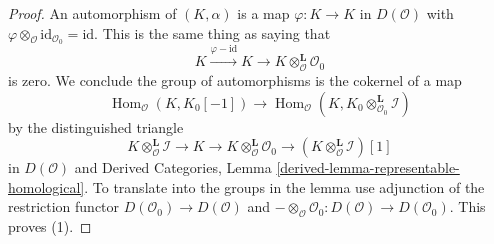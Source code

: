 \documentclass{stacks-project}
\theoremstyle{plain}
\theoremstyle{definition}
\theoremstyle{remark}
\numberwithin{equation}{subsection}
\def\Hom{\mathop{\mathrm{Hom}}\nolimits}
\begin{document}
\begin{proof}
An automorphism of $(K, \alpha)$ is a map $\varphi : K \to K$
in $D(\mathcal{O})$ with
$\varphi \otimes_\mathcal{O} \text{id}_{\mathcal{O}_0} = \text{id}$.
This is the same thing as saying that
$$
K \xrightarrow{\varphi - \text{id}} K \to
K \otimes_\mathcal{O}^\mathbf{L} \mathcal{O}_0
$$
is zero. We conclude the group of automorphisms is
the cokernel of a map
$$
\Hom_\mathcal{O}(K, K_0[-1])
\longrightarrow
\Hom_\mathcal{O}(K, K_0 \otimes_{\mathcal{O}_0}^\mathbf{L} \mathcal{I})
$$
by the distinguished triangle
$$
K \otimes_\mathcal{O}^\mathbf{L} \mathcal{I} \to
K \to
K \otimes_\mathcal{O}^\mathbf{L} \mathcal{O}_0 \to
(K \otimes_\mathcal{O}^\mathbf{L} \mathcal{I})[1]
$$
in $D(\mathcal{O})$ and 
Derived Categories, Lemma \ref{derived-lemma-representable-homological}.
To translate into the groups in the lemma use adjunction
of the restriction functor $D(\mathcal{O}_0) \to D(\mathcal{O})$ and
$- \otimes_\mathcal{O} \mathcal{O}_0 : D(\mathcal{O}) \to D(\mathcal{O}_0)$.
This proves (1).


\end{proof}
\end{document}
